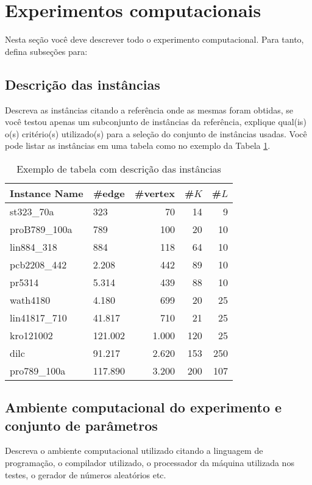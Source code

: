 \documentclass[12pt,fleqn]{article}
\begin{document}
\section{Experimentos computacionais}
\label{secResultados}
Nesta seção você deve descrever todo o experimento computacional. Para tanto, defina subseções para:

\subsection{Descrição das instâncias}
\label{subSecInstancias}
Descreva as instâncias citando a referência onde as mesmas foram obtidas, se você testou apenas um subconjunto de instâncias da referência, explique qual(is) o(s) critério(s) utilizado(s) para a seleção do conjunto de instâncias usadas. Você pode listar as instâncias em uma tabela como no exemplo da Tabela \ref{tabInstancias}.
\begin{table}[!h]
\centering
\begin{tabular}{l|l|r|r|r}
\hline
\multicolumn{1}{c|}{\textbf{Instance Name}} & \multicolumn{1}{c|}{\textbf{\#edge}} & \multicolumn{1}{c|}{\textbf{\#vertex}} & \multicolumn{1}{c|}{\textbf{\#$K$}} & \multicolumn{1}{c}{\textbf{\#$L$}}  \\ \hline
st323\_70a & 323 & 70 & 14 & 9   \\ \hline
proB789\_100a & 789 & 100 & 20 & 10  \\ \hline
lin884\_318 & 884 & 118 & 64 & 10   \\ \hline \hline
pcb2208\_442 & 2.208  & 442 & 89 & 10  \\ \hline
pr5314 & 5.314 & 439 & 88 & 10  \\ \hline
wath4180 & 4.180 & 699 & 20 & 25\\ \hline
lin41817\_710 & 41.817 & 710 & 21 & 25  \\ \hline \hline
kro121002 & 121.002 & 1.000 & 120 & 25  \\ \hline
dilc & 91.217 & 2.620 & 153 & 250  \\ \hline
pro789\_100a & 117.890 & 3.200 & 200 & 107  \\ \hline
\end{tabular}
\caption{Exemplo de tabela com descrição das instâncias}
\label{tabInstancias}
\end{table}


\subsection{Ambiente computacional do experimento e conjunto de parâmetros}
\label{subSecAmbiente}
Descreva o ambiente computacional utilizado citando a linguagem de programação, o compilador utilizado, o processador da máquina utilizada nos testes, o gerador de números aleatórios etc.
\end{document}
